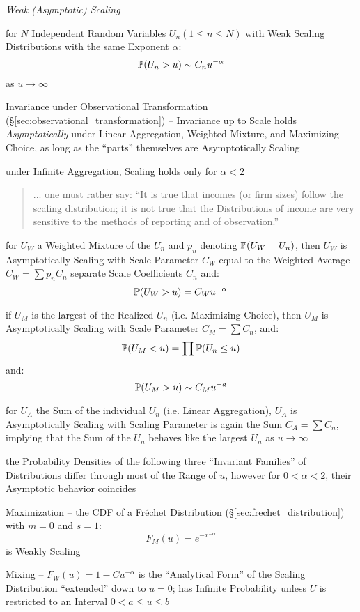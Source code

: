 \emph{Weak (Asymptotic) Scaling}

for $N$ Independent Random Variables $U_n(1 \leq n \leq N)$ with Weak Scaling
Distributions with the same Exponent $\alpha$:
\[
  \mathbb{P}(U_n > u) \sim C_n u^{-\alpha}
\]
as $u \to \infty$

Invariance under Observational Transformation
(\S\ref{sec:observational_transformation}) -- Invariance up to Scale holds
\emph{Asymptotically} under Linear Aggregation, Weighted Mixture, and Maximizing
Choice, as long as the ``parts'' themselves are Asymptotically Scaling

under Infinite Aggregation, Scaling holds only for $\alpha < 2$

\begin{quote}
  ... one must rather say: ``It is true that incomes (or firm sizes) follow the
  scaling distribution; it is not true that the Distributions of income are very
  sensitive to the methods of reporting and of observation.''
\end{quote}

for $U_W$ a Weighted Mixture of the $U_n$ and $p_n$ denoting $\mathbb{P}(U_W = U_n)$,
then $U_W$ is Asymptotically Scaling with Scale Parameter $C_W$ equal to the
Weighted Average $C_W = \sum p_n C_n$ separate Scale Coefficients $C_n$ and:
\[
  \mathbb{P}(U_W > u) = C_W u^{-\alpha}
\]

if $U_M$ is the largest of the Realized $U_n$ (i.e. Maximizing Choice), then
$U_M$ is Asymptotically Scaling with Scale Parameter $C_M = \sum C_n$, and:
\[
  \mathbb{P}(U_M < u) = \prod \mathbb{P}(U_n \leq u)
\]
and:
\[
  \mathbb{P}(U_M > u) \sim C_M u^{-a}
\]

for $U_A$ the Sum of the individual $U_n$ (i.e. Linear Aggregation), $U_A$ is
Asymptotically Scaling with Scaling Parameter is again the Sum $C_A = \sum C_n$,
implying that the Sum of the $U_n$ behaves like the largest $U_n$ as
$u \to \infty$

the Probability Densities of the following three ``Invariant Families'' of
Distributions differ through most of the Range of $u$, however for $0 < \alpha <
2$, their Asymptotic behavior coincides

Maximization -- the CDF of a Fr\'echet Distribution
(\S\ref{sec:frechet_distribution}) with $m = 0$ and $s = 1$:
\[
  F_M(u) = e^{-x^{-\alpha}}
\]
is Weakly Scaling

Mixing -- $F_W(u) = 1 - Cu^{-\alpha}$ is the ``Analytical Form'' of the Scaling
Distribution ``extended'' down to $u = 0$; has Infinite Probability unless $U$
is restricted to an Interval $0 < a \leq u \leq b$

